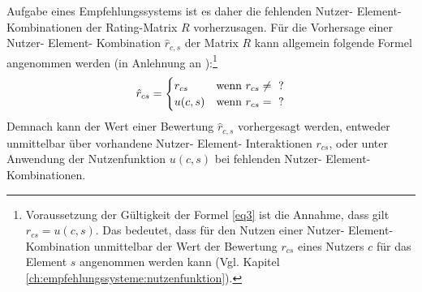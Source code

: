 Aufgabe eines Empfehlungssystems ist es daher die fehlenden Nutzer- Element- Kombinationen der Rating-Matrix $R$ vorherzusagen.
Für die Vorhersage einer Nutzer- Element- Kombination $\hat{r}_{c,s}$ der Matrix $R$ kann allgemein folgende Formel angenommen werden (in Anlehnung an \cite[S. 743]{adomavicius:inproceedings}):\footnote{Voraussetzung der Gültigkeit der Formel \ref{eq3} ist die Annahme, dass gilt $r_{cs} = u(c,s)$. Das bedeutet, dass für den Nutzen einer Nutzer- Element- Kombination unmittelbar der Wert der Bewertung $r_{cs}$ eines Nutzers $c$ für das Element $s$ angenommen werden kann (Vgl. Kapitel \ref{ch:empfehlungssysteme:nutzenfunktion}).}
\begin{equation}\label{eq3}
\hat{r}_{cs} =
    \begin{cases}
        r_{cs} & \textnormal{wenn } r_{cs} \neq \textnormal{ ?} \\
        u(c,s) & \textnormal{wenn }r_{cs} = \textnormal{ ?} \\
    \end{cases}
\end{equation}
Demnach kann der Wert einer Bewertung $\hat{r}_{c,s}$ vorhergesagt werden, entweder unmittelbar über vorhandene Nutzer- Element- Interaktionen $r_{cs}$, oder unter Anwendung der Nutzenfunktion $u(c,s)$ bei fehlenden Nutzer- Element- Kombinationen.

